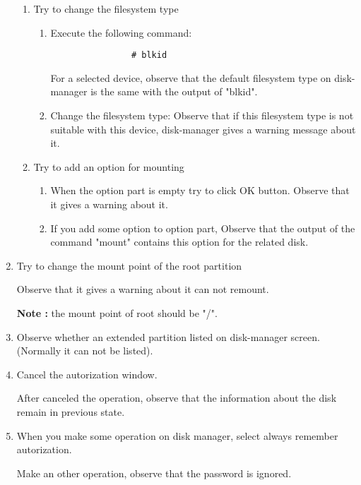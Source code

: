 \documentclass[a4paper,10pt]{article}
\begin{document}
\begin{enumerate}
\begin{enumerate}
    \item Try to change the filesystem type
        \begin{enumerate}
            \item Execute the following command:
            \begin{verbatim}
                # blkid
            \end{verbatim}
                  For a selected device, observe that the default filesystem type on disk-manager is the same with the output of "blkid".
            \item Change the filesystem type:
                  Observe that if this filesystem type is not suitable with this device, disk-manager gives a warning message about it.
        \end{enumerate}

    \item Try to add an option for mounting
        \begin{enumerate}
          \item When the option part is empty try to click OK button.
                Observe that it gives a warning about it.
          \item If you add some option to option part,
                Observe that the output of the command "mount" contains this option for the related disk.
        \end{enumerate}
    \end{enumerate}

\item Try to change the mount point of the root partition

      Observe that it gives a warning about it can not remount.

        \textbf{Note :} the mount point of root should be "/".

\item Observe whether an extended partition listed on disk-manager screen. (Normally it can not be listed).

\item Cancel the autorization window.

After canceled the operation, observe that the information about the disk remain in previous state.

\item When you make some operation on disk manager, select always remember autorization.

Make an other operation, observe that the password is ignored.

\end{enumerate}
\end{document}
